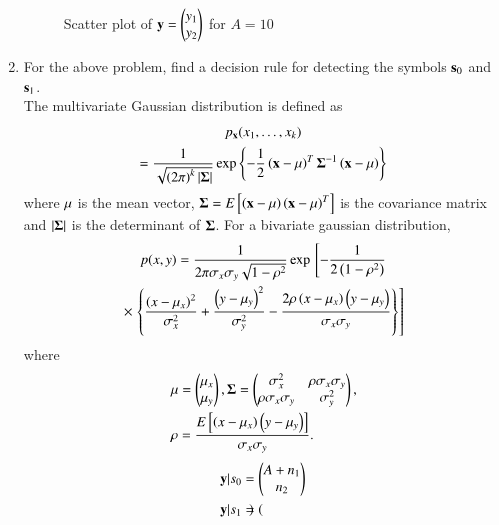 \begin{enumerate}[label=\thesection.\arabic*.,ref=\thesection.\theenumi]
\begin{figure}
\caption{Scatter plot of $\mathbf{y} = \begin{pmatrix} y_1 \\ y_2 \end{pmatrix}$ for $A = 10$}
\label{fig:scatter_plt_y}
\end{figure}
%
%
\item
For the above problem, find a decision rule for detecting the symbols $\mathbf{s}_0 $ and $\mathbf{s}_1$.
\\
\solution The multivariate Gaussian distribution is defined as
%
\begin{multline}
\label{eq:multivariate}
p_{\mathbf{x}}(x_1,\dots,x_k)
\\
=\frac{1}{\sqrt{\left(2\pi\right)^k\left\vert\mathbf{\Sigma}\right\vert}}\exp\left\{-\frac{1}{2}\left(\mathbf{x}-\mathbf{\mu}\right)^T\mathbf{\Sigma}^{-1}\left(\mathbf{x}-\mathbf{\mu}\right)\right\}
\end{multline}
%
where $\mathbf{\mu}$ is the mean vector, $\mathbf{\Sigma} = E{}\left[\left(\mathbf{x}-\mathbf{\mu}\right)\left(\mathbf{x}-\mathbf{\mu}\right)^T\right]$ is the covariance matrix and $\left\vert\mathbf{\Sigma}\right\vert$ is the determinant of $\mathbf{\Sigma}$.
For a bivariate gaussian distribution,
{\small
\begin{multline}
\label{eq:bivariate}
p(x,y)= \frac{1}{2\pi \sigma_x\sigma_y\sqrt{1-\rho^2}}\exp{}\left[-\frac{1}{2\left(1-\rho^2\right)}\right.
\\
\times {}\left.\left\{\frac{\left(x-\mu_x\right)^2}{\sigma_x^2}+\frac{\left(y-\mu_y\right)^2}{\sigma_y^2}-\frac{2\rho\left(x-\mu_x\right)\left(y-\mu_y\right)}{\sigma_x\sigma_y}\right\}\right]
\end{multline}
}
%
where
%
\begin{align}
&\mbf{\mu}=
\begin{pmatrix*}
\mu_x \\
\mu_y
\end{pmatrix*},
\mbf{\Sigma} = 
\begin{pmatrix*}%
\sigma_x^2 & \rho\sigma_x\sigma_y \\
\rho\sigma_x\sigma_y & \sigma_y^2
\end{pmatrix*},\\
&\rho = \frac{E\sbrak{\brak{x - \mu_x}\brak{y-\mu_y}}}{\sigma_x\sigma_y}.
\end{align}
%
\begin{align}
    \mathbf{y}|s_0 &= 
    \begin{pmatrix}
    A+n_1 \\
    n_2
    \end{pmatrix}\\
    \mathbf{y}|s_1 &=  
    \begin{pmatrix}

\end{pmatrix}
\end{align}
\end{enumerate}
